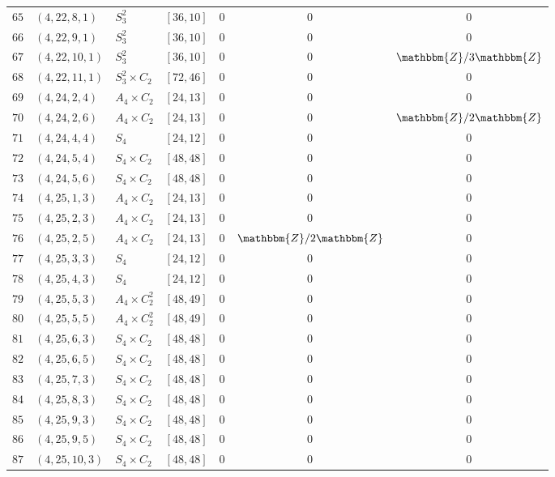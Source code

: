 \documentclass{amsart}
\theoremstyle{plain}
\theoremstyle{definition}
\theoremstyle{remark}
\newcommand{\bZ}{\mathbbm{Z}}\newcommand{\bQ}{\mathbbm{Q}}
\begin{document}
{\begin{longtable}{llll|ccc}
$65$ & $( 4, 22, 8, 1 )$ & $S_3^2$ & $[ 36, 10 ]$& $0$ & $0$ & $0$\\
$66$ & $( 4, 22, 9, 1 )$ & $S_3^2$ & $[ 36, 10 ]$& $0$ & $0$ & $0$\\
$67$ & $( 4, 22, 10, 1 )$ & $S_3^2$ & $[ 36, 10 ]$& $0$ & $0$ & $\bZ/3\bZ$\\
$68$ & $( 4, 22, 11, 1 )$ & $S_3^2 \times C_2$ & $[ 72, 46 ]$& $0$ & $0$ & $0$\\
$69$ & $( 4, 24, 2, 4 )$ & $A_4\times C_2$ & $[ 24, 13 ]$& $0$ & $0$ & $0$\\
$70$ & $( 4, 24, 2, 6 )$ & $A_4\times C_2$ & $[ 24, 13 ]$& $0$ & $0$ & $\bZ/2\bZ$\\
$71$ & $( 4, 24, 4, 4 )$ & $S_4$ & $[ 24, 12 ]$& $0$ & $0$ & $0$\\
$72$ & $( 4, 24, 5, 4 )$ & $S_4\times C_2$ & $[ 48, 48 ]$& $0$ & $0$ & $0$\\
$73$ & $( 4, 24, 5, 6 )$ & $S_4\times C_2$ & $[ 48, 48 ]$& $0$ & $0$ & $0$\\
$74$ & $( 4, 25, 1, 3 )$ & $A_4\times C_2$ & $[ 24, 13 ]$& $0$ & $0$ & $0$\\
$75$ & $( 4, 25, 2, 3 )$ & $A_4\times C_2$ & $[ 24, 13 ]$& $0$ & $0$ & $0$\\
$76$ & $( 4, 25, 2, 5 )$ & $A_4\times C_2$ & $[ 24, 13 ]$& $0$ & $\bZ/2\bZ$ & $0$\\
$77$ & $( 4, 25, 3, 3 )$ & $S_4$ & $[ 24, 12 ]$& $0$ & $0$ & $0$\\
$78$ & $( 4, 25, 4, 3 )$ & $S_4$ & $[ 24, 12 ]$& $0$ & $0$ & $0$\\
$79$ & $( 4, 25, 5, 3 )$ & $A_4 \times C_2^2$ & $[ 48, 49 ]$& $0$ & $0$ & $0$\\
$80$ & $( 4, 25, 5, 5 )$ & $A_4 \times C_2^2$ & $[ 48, 49 ]$& $0$ & $0$ & $0$\\
$81$ & $( 4, 25, 6, 3 )$ & $S_4\times C_2$ & $[ 48, 48 ]$& $0$ & $0$ & $0$\\
$82$ & $( 4, 25, 6, 5 )$ & $S_4\times C_2$ & $[ 48, 48 ]$& $0$ & $0$ & $0$\\
$83$ & $( 4, 25, 7, 3 )$ & $S_4\times C_2$ & $[ 48, 48 ]$& $0$ & $0$ & $0$\\
$84$ & $( 4, 25, 8, 3 )$ & $S_4\times C_2$ & $[ 48, 48 ]$& $0$ & $0$ & $0$\\
$85$ & $( 4, 25, 9, 3 )$ & $S_4\times C_2$ & $[ 48, 48 ]$& $0$ & $0$ & $0$\\
$86$ & $( 4, 25, 9, 5 )$ & $S_4\times C_2$ & $[ 48, 48 ]$& $0$ & $0$ & $0$\\
$87$ & $( 4, 25, 10, 3 )$ & $S_4\times C_2$ & $[ 48, 48 ]$& $0$ & $0$ & $0$\\

\end{longtable}}
\end{document}
